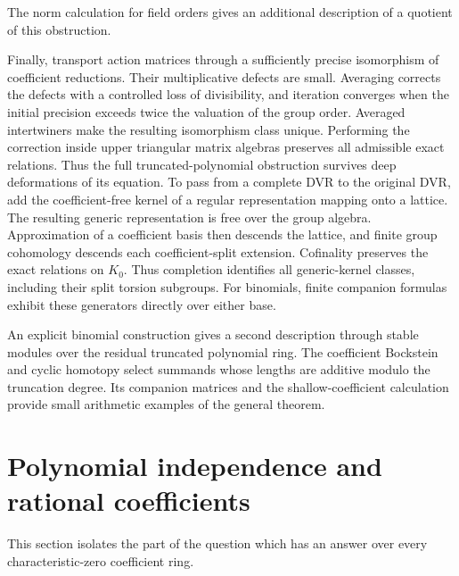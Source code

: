 \documentclass[11pt,a4paper]{article}
\theoremstyle{definition}\newtheorem{definition}[theorem]{Definition}
\theoremstyle{remark}\newtheorem{remark}[theorem]{Remark}
\begin{document}
The norm calculation for field orders gives an additional description
of a quotient of this obstruction.


Finally, transport action matrices through a sufficiently precise
isomorphism of coefficient reductions.  Their multiplicative defects
are small.  Averaging corrects the defects with a controlled loss
of divisibility, and iteration converges when the initial precision
exceeds twice the valuation of the group order.  Averaged
intertwiners make the resulting isomorphism class unique.  Performing
the correction inside upper triangular matrix algebras preserves
all admissible exact relations.  Thus the full truncated-polynomial
obstruction survives deep deformations of its equation.
To pass from a complete DVR to the original DVR, add the coefficient-free
kernel of a regular representation mapping onto a lattice.  The resulting
generic representation is free over the group algebra.  Approximation
of a coefficient basis then descends the lattice, and finite group
cohomology descends each coefficient-split extension.  Cofinality
preserves the exact relations on $K_0$.  Thus completion identifies
all generic-kernel classes, including their split torsion subgroups.
For binomials, finite companion formulas exhibit these generators
directly over either base.

An explicit binomial construction gives a second description through
stable modules over the residual truncated polynomial ring.  The
coefficient Bockstein and cyclic homotopy select summands whose
lengths are additive modulo the truncation degree.  Its companion
matrices and the shallow-coefficient calculation provide small
arithmetic examples of the general theorem.

\section{Polynomial independence and rational coefficients}

This section isolates the part of the question which has an answer
over every characteristic-zero coefficient ring.
\end{document}
